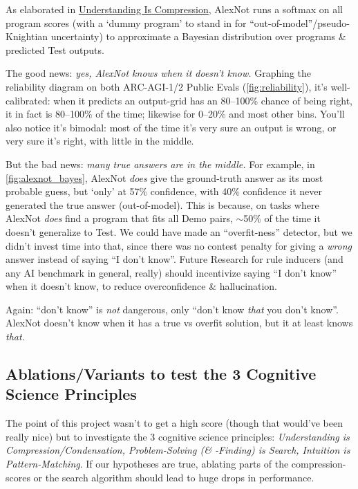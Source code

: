 \documentclass[11pt]{article}
\begin{document}
As elaborated in \hyperref[sec:compression]{Understanding Is Compression}, AlexNot runs a softmax on all program scores (with a `dummy program' to stand in for ``out-of-model''/pseudo-Knightian uncertainty) to approximate a Bayesian distribution over programs \& predicted Test outputs. 

The good news: \textit{yes, AlexNot knows when it doesn't know.} Graphing the reliability diagram on both ARC-AGI-1/2 Public Evals (\autoref{fig:reliability}), it's well-calibrated: when it predicts an output-grid has an 80–100\% chance of being right, it in fact is 80–100\% of the time; likewise for 0–20\% and most other bins. You'll also notice it's bimodal: most of the time it's very sure an output is wrong, or very sure it's right, with little in the middle.

But the bad news: \textit{many true answers are in the middle.} For example, in \autoref{fig:alexnot_bayes}, AlexNot \textit{does} give the ground-truth answer as its most probable guess, but `only' at 57\% confidence, with 40\% confidence it never generated the true answer (out-of-model). This is because, on tasks where AlexNot \textit{does} find a program that fits all Demo pairs, $\sim$50\% of the time it doesn't generalize to Test. We could have made an ``overfit-ness'' detector, but we didn't invest time into that, since there was no contest penalty for giving a \textit{wrong} answer instead of saying ``I don't know''. Future Research for rule inducers (and any AI benchmark in general, really) should incentivize saying ``I don't know'' when it doesn't know, to reduce overconfidence \& hallucination.

Again: ``don't know'' is \textit{not} dangerous, only ``don't know \textit{that} you don't know''. AlexNot doesn't know when it has a true vs overfit solution, but it at least knows \textit{that.}

\subsection{Ablations/Variants to test the 3 Cognitive Science Principles}

The point of this project wasn't to get a high score (though that would've been really nice) but to investigate the 3 cognitive science principles: \textit{Understanding is Compression/Condensation, Problem-Solving (\& -Finding) is Search, Intuition is Pattern-Matching}. If our hypotheses are true, ablating parts of the compression-scores or the search algorithm should lead to huge drops in performance.
\end{document}
